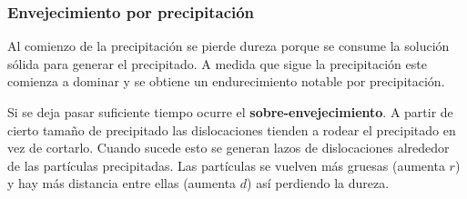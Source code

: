 \subsubsection{Envejecimiento por precipitación}
Al comienzo de la precipitación se pierde dureza porque se consume la solución sólida para generar el precipitado. A medida que sigue la precipitación este comienza a dominar y se obtiene un endurecimiento notable por precipitación. 

Si se deja pasar suficiente tiempo ocurre el \textbf{sobre-envejecimiento}. A partir de cierto tamaño de precipitado las dislocaciones tienden a rodear el precipitado en vez de cortarlo. Cuando sucede esto se generan lazos de dislocaciones alrededor de las partículas precipitadas. Las partículas se vuelven más gruesas (aumenta $r$) y hay más distancia entre ellas (aumenta $d$) así perdiendo la dureza.








